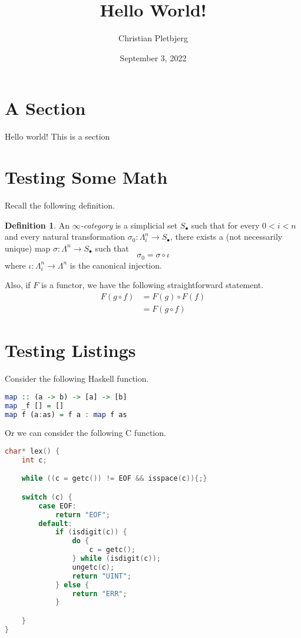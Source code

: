 \documentclass{article}
\title{Hello World!}
\author{Christian Pletbjerg}
\date{September 3, 2022}
\theoremstyle{plain}%
\theoremstyle{definition}
\newtheorem{defn}{Definition}[section]
\theoremstyle{remark}
\begin{document}
\maketitle

\tableofcontents

\section{A Section}
Hello world! This is a section

\section{Testing Some Math}
Recall the following definition.
\begin{defn}
    An \emph{$\infty$-category} is a simplicial set $S_\bullet$ such that
    for every $ 0 < i < n$ and every natural transformation $\sigma_0 : \Lambda^n_i \to S_\bullet$, there exists a (not necessarily unique) map $\sigma : \Lambda^n \to S_\bullet$
    such that
    \[
        \sigma_0 = \sigma \circ \iota
    \]
    where $\iota : \Lambda^n_i \to \Lambda^n$ is the canonical injection.
\end{defn}

Also, if $F$ is a functor, we have the following straightforward statement.
\[
\begin{aligned}
    F( g \circ f ) 
        &=  F( g ) \circ F (f ) \\
        &=  F( g \circ f ) 
\end{aligned}
\]

\section{Testing Listings}
Consider the following Haskell function.
\begin{lstlisting}[language=Haskell]
map :: (a -> b) -> [a] -> [b]
map _f [] = []
map f (a:as) = f a : map f as
\end{lstlisting}

Or we can consider the following C function.
\begin{lstlisting}[language=C]
char* lex() {
    int c; 

    while ((c = getc()) != EOF && isspace(c)){;}

    switch (c) {
        case EOF:
            return "EOF";
        default:
            if (isdigit(c)) {
                do {
                    c = getc();
                } while (isdigit(c));
                ungetc(c);
                return "UINT";
            } else {
                return "ERR";
            }

    }
}
\end{lstlisting}
\end{document}
